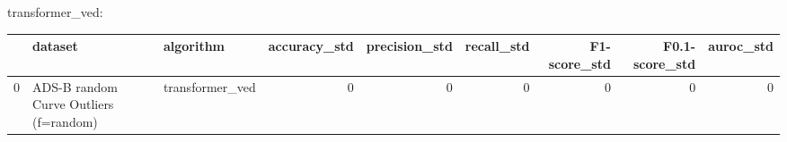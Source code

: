 transformer_ved:

\begin{tabular}{rllrrrrrr}
\hline
    & dataset                                & algorithm       &   accuracy\_std &   precision\_std &   recall\_std &   F1-score\_std &   F0.1-score\_std &   auroc\_std \\
\hline
  0 & ADS-B random Curve Outliers (f=random) & transformer\_ved &              0 &               0 &            0 &              0 &                0 &           0 \\
\hline
\end{tabular}


